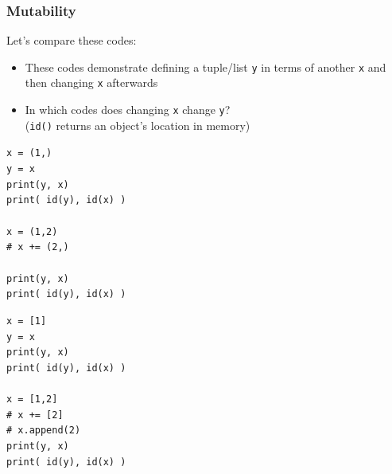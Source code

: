 \documentclass{beamer}
\newcommand{\code}[1]{\texttt{#1}}
\newcommand{\tab}{\hspace*{22pt}}
\begin{document}
\begin{frame}%
	\frametitle{Mutability}
	
	\begin{block}{Let's compare these codes:}
		\begin{itemize}
			\item These codes demonstrate defining a tuple/list \code{y} in terms of another \code{x} and then changing \code{x} afterwards
			\item In which codes does changing \code{x} change \code{y}? \\
					(\code{id()} returns an object's location in memory)
		\end{itemize}
		
		\vspace{10pt}
			\begin{footnotesize}
			\code{x = (1,) \\
			y = x \\
			print(y, x) \\
			print( id(y), id(x) ) \\
			\tab \\
			x = (1,2) \\
			\# x += (2,) \\
			\tab \\
			print(y, x) \\
			print( id(y), id(x) )
			}
			\end{footnotesize}
		\endminipage\hfill
			\begin{footnotesize}
			\code{x = [1] \\
			y = x \\
			print(y, x) \\
			print( id(y), id(x) ) \\
			\tab \\
			x = [1,2] \\
			\# x += [2] \\
			\# x.append(2) \\
			print(y, x) \\
			print( id(y), id(x) )
			}
			\end{footnotesize}
		\endminipage\hfill
	\end{block}
	
\end{frame}
\end{document}
